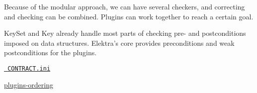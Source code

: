 Because of the modular approach, we can have several checkers, and correcting and checking can be combined. Plugins can work together to reach a certain goal.

{\ttfamily Key\+Set} and {\ttfamily Key} already handle most parts of checking pre-\/ and postconditions imposed on data structures. Elektra’s core provides preconditions and weak postconditions for the plugins.


\begin{DoxyItemize}
\item \href{/home/mpranj/workspace/libelektra/doc/CONTRACT.ini}{\texttt{ C\+O\+N\+T\+R\+A\+C\+T.\+ini}}
\item \mbox{\hyperlink{doc_dev_plugins-ordering_md}{plugins-\/ordering}} 
\end{DoxyItemize}